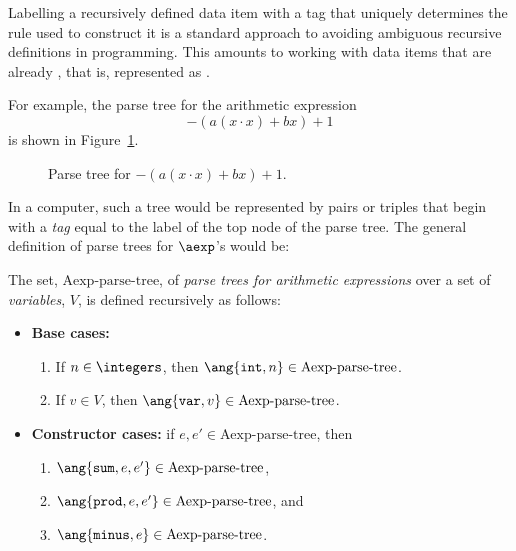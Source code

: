 \begin{definition}
\begin{staffnotes}
Labelling a recursively defined data item with a tag that uniquely
determines the rule used to construct it is a standard approach to
avoiding ambiguous recursive definitions in programming.  This
amounts to working with data items that are already , that
is, represented as .

For example, the parse tree for the arithmetic expression
\begin{equation}\label{ax}
-(a(x\cdot x)+ bx) + 1
\end{equation}
is shown in Figure~\ref{fig:parse}.

\begin{figure}
\caption{Parse tree for $-(a(x\cdot x)+ bx) + 1$.}
\label{fig:parse}
\end{figure}

In a computer, such a tree would be represented by pairs or triples
that begin with a
\emph{tag} equal to the label of the top node of the parse tree.  
The general definition of parse trees for $\aexp$'s would be:

\newcommand{\paexp}{\text{Aexp-parse-tree}}

\begin{definition}\label{arithparse}
The set, $\paexp$, of \emph{parse trees for arithmetic expressions} 
over a set of
\emph{variables}, $V$, is defined recursively as follows:
\begin{itemize}
\item \textbf{Base cases:}
\begin{enumerate}
\item If $n \in \integers$, then $\ang{\texttt{int}, n} \in \paexp$.
\item If $v \in V$, then $\ang{\texttt{var}, v} \in \paexp$.
\end{enumerate}
\item \textbf{Constructor cases:} if $e,e' \in \paexp$, then
\begin{enumerate}
\item $\ang{\texttt{sum}, e, e'} \in \paexp$,
\item $\ang{\texttt{prod}, e, e'} \in \paexp$, and
\item $\ang{\texttt{minus}, e} \in \paexp$.
\end{enumerate}
\end{itemize}
\end{definition}


\end{staffnotes}
\end{definition}
